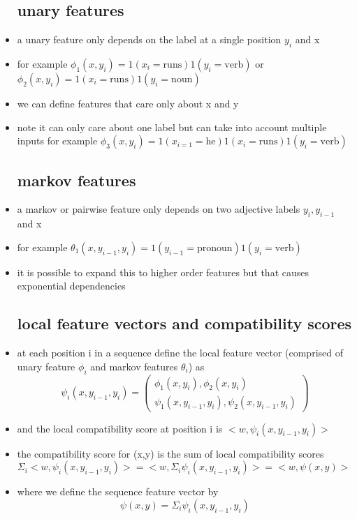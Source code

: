 \documentclass{article}
\begin{document}
\begin{itemize}
\subsection*{unary features}
\item a unary feature only depends on the label at a single position $y_i$ and x 
\item for example $\phi_{1}(x,y_i)=1(x_i=\text{runs})1(y_i=\text{verb})$ or $\phi_{2}(x,y_i)=1(x_i=\text{runs})1(y_i=\text{noun})$ 
\item we can define features that care only about x and y 
\item note it can only care about one label but can take into account multiple inputs for example $\phi_{3}(x,y_i)=1(x_{i=1}=\text{he})1(x_i=\text{runs})1(y_i=\text{verb})$
\subsection*{markov features}
\item a markov or pairwise feature only depends on two adjective labels $y_i, y_{i-1}$ and x
\item for example $\theta_{1}(x,y_{i-1},y_i)=1(y_{i-1}=\text{pronoun})1(y_i=\text{verb})$
\item it is possible to expand this to higher order features but that causes exponential dependencies  
\subsection*{local feature vectors and compatibility scores}
\item at each position i in a sequence define the local feature vector (comprised of unary feature $\phi_{i}$ and markov features $\theta_i$) as $$\psi_{i}(x,y_{i-1},y_i)=\begin{pmatrix}
    \phi_1(x,y_i),\phi_2(x,y_i) \\ \psi_1(x,y_{i-1}, y_i), \psi_2(x,y_{i-1}, y_i) 
\end{pmatrix}$$
\item and the local compatibility score at position i is $<w,\psi_{i}(x,y_{i-1}, y_i)>$
\item the compatibility score for (x,y) is the sum of local compatibility scores $\Sigma_{i}<w,\psi_{i}(x,y_{i-1}, y_i)>=<w,\Sigma_{i}\psi_{i}(x,y_{i-1}, y_i)>=<w,\psi(x,y)>$
\item where we define the sequence feature vector by $$\psi(x,y)=\Sigma_{i}\psi_{i}(x,y_{i-1}, y_i)$$

\end{itemize}
\end{document}
